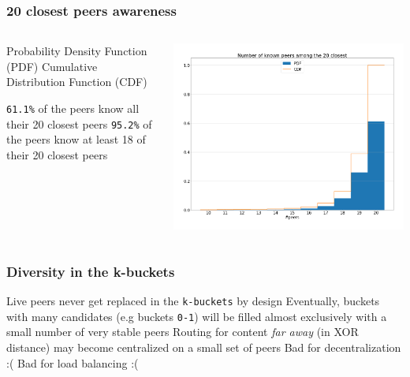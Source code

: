 \documentclass{pl-slide}
\begin{document}
\begin{frame}
\frametitle{20 closest peers awareness}

\begin{columns}[onlytextwidth]
\begin{column}{0.38\textwidth}
\begin{enumerate}
   	\itemc Probability Density Function (PDF)
   	\itemc Cumulative Distribution Function (CDF)
\end{enumerate}
\bigskip
\begin{itemize}
   	\itemc \texttt{61.1\%} of the peers know all their 20 closest peers
   	\itemc \texttt{95.2\%} of the peers know at least 18 of their 20 closest peers
\end{itemize}
\end{column}
\begin{column}{0.58\textwidth}
    \begin{center}
		\includegraphics[width=\textwidth]{plots/known-peers-among-20-closest.png}
    \end{center}
\end{column}
\end{columns}
\end{frame}

\begin{frame}
\frametitle{Diversity in the k-buckets}

\begin{itemize}
	\itemc Live peers never get replaced in the \texttt{k-buckets} by design
	\itemc Eventually, buckets with many candidates (e.g buckets \texttt{0-1}) will be filled almost exclusively with a small number of very stable peers
	\itemc Routing for content \textit{far away} (in XOR distance) may become centralized on a small set of peers
	\itemc Bad for decentralization :(
	\itemc Bad for load balancing :(
\end{itemize}
\end{frame}
\end{document}
